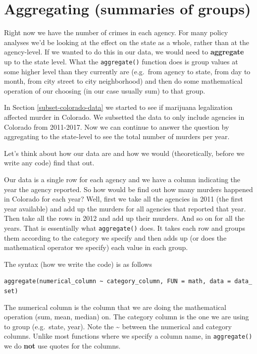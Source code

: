 \documentclass[
]{krantz}
\begin{document}
\hypertarget{aggregate}{%
\section{Aggregating (summaries of groups)}\label{aggregate}}

Right now we have the number of crimes in each agency. For many policy analyses we'd be looking at the effect on the state as a whole, rather than at the agency-level. If we wanted to do this in our data, we would need to \textbf{aggregate} up to the state level. What the \texttt{aggregate()} function does is group values at some higher level than they currently are (e.g.~from agency to state, from day to month, from city street to city neighborhood) and then do some mathematical operation of our choosing (in our case usually sum) to that group.

In Section \ref{subset-colorado-data} we started to see if marijuana legalization affected murder in Colorado. We subsetted the data to only include agencies in Colorado from 2011-2017. Now we can continue to answer the question by aggregating to the state-level to see the total number of murders per year.

Let's think about how our data are and how we would (theoretically, before we write any code) find that out.

Our data is a single row for each agency and we have a column indicating the year the agency reported. So how would be find out how many murders happened in Colorado for each year? Well, first we take all the agencies in 2011 (the first year available) and add up the murders for all agencies that reported that year. Then take all the rows in 2012 and add up their murders. And so on for all the years. That is essentially what \texttt{aggregate()} does. It takes each row and groups them according to the category we specify and then adds up (or does the mathematical operator we specify) each value in each group.

The syntax (how we write the code) is as follows

\texttt{aggregate(numerical\_column\ \textasciitilde{}\ category\_column,\ FUN\ =\ math,\ data\ =\ data\_set)}

The numerical column is the column that we are doing the mathematical operation (sum, mean, median) on. The category column is the one we are using to group (e.g.~state, year). Note the \textasciitilde{} between the numerical and category columns. Unlike most functions where we specify a column name, in \texttt{aggregate()} we do \textbf{not} use quotes for the columns.
\end{document}

